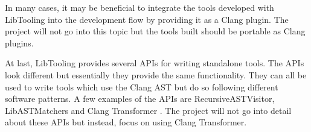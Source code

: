 In many cases, it may be beneficial to integrate the tools developed with LibTooling into the development flow by providing it as a Clang plugin. The project will not go into this topic but the tools built should be portable as Clang plugins.

At last, LibTooling provides several APIs for writing standalone tools. The APIs look different but essentially they provide the same functionality. They can all be used to write tools which use the Clang AST but do so following different software patterns. A few examples of the APIs are RecursiveASTVisitor, LibASTMatchers and Clang Transformer \cite{HowWriteRecursiveASTVisitor,llvmWelcomeClangDocumentation}. The project will not go into detail about these APIs but instead, focus on using Clang Transformer.